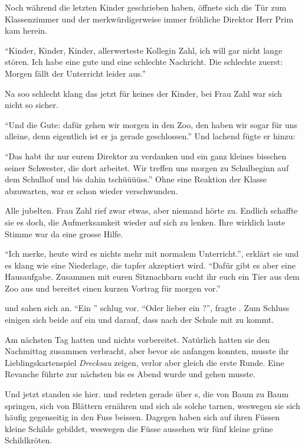 Noch während die letzten Kinder geschrieben haben, öffnete sich die Tür zum Klassenzimmer und der merkwürdigerweise immer fröhliche Direktor Herr Prim kam herein.

\enquote{Kinder, Kinder, Kinder, allerwerteste Kollegin Zahl, ich will gar nicht lange stören. Ich habe eine gute und eine schlechte Nachricht. Die schlechte zuerst: Morgen fällt der Unterricht leider aus.}

Na soo schlecht klang das jetzt für keines der Kinder, bei Frau Zahl war sich  nicht so sicher.

\enquote{Und die Gute: dafür gehen wir morgen in den Zoo, den haben wir sogar für uns alleine, denn eigentlich ist er ja gerade geschlossen.} Und lachend fügte er hinzu:

\enquote{Das habt ihr nur eurem Direktor zu verdanken und ein ganz kleines bisschen seiner Schwester, die dort arbeitet. Wir treffen uns morgen zu Schulbeginn auf dem Schulhof und bis dahin tschüüüüss.} Ohne eine Reaktion der Klasse abzuwarten, war er schon wieder verschwunden.

Alle jubelten. Frau Zahl rief zwar etwas, aber niemand hörte zu. Endlich schaffte sie es doch, die Aufmerksamkeit wieder auf sich zu lenken. Ihre wirklich laute Stimme war da eine grosse Hilfe.

\enquote{Ich merke, heute wird es nichts mehr mit normalem Unterricht.}, erklärt sie und es klang wie eine Niederlage, die tapfer akzeptiert wird. \enquote{Dafür gibt es aber eine Hausaufgabe. Zusammen mit euren Sitznachbarn sucht ihr euch ein Tier aus dem Zoo aus und bereitet einen kurzen Vortrag für morgen vor.}

 und  sahen sich an. \enquote{Ein } schlug  vor. \enquote{Oder lieber ein ?}, fragte . Zum Schluss einigen sich beide auf ein  und darauf, dass  nach der Schule mit zu  kommt.

Am nächsten Tag hatten  und  nichts vorbereitet. Natürlich hatten sie den Nachmittag zusammen verbracht, aber bevor sie anfangen konnten, musste   ihr Lieblingskartenspiel \textit{Drecksau} zeigen, verlor aber gleich die erste Runde. Eine Revanche führte zur nächsten bis es Abend wurde und  gehen musste.

Und jetzt standen sie hier.  und  redeten gerade über s, die von Baum zu Baum springen, sich von Blättern ernähren und sich als solche tarnen, weswegen sie sich häufig gegenseitig in den Fuss beissen. Dagegen haben sich auf ihren Füssen kleine Schilde gebildet, weswegen die Füsse aussehen wir fünf kleine grüne Schildkröten.


